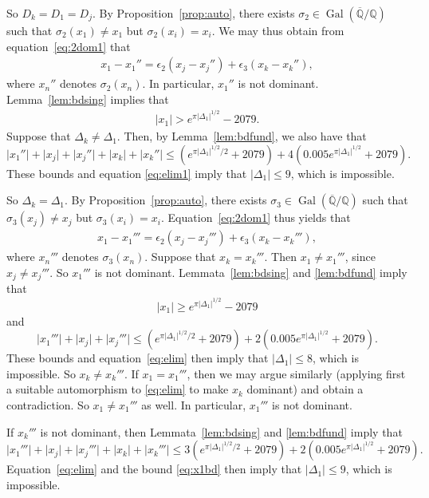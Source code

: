 \documentclass[12pt,a4paper,oneside]{amsart}
\DeclareMathOperator{\gal}{Gal}
\begin{document}
So $D_k = D_1 = D_j$. By Proposition~\ref{prop:auto}, there exists $\sigma_2 \in \gal(\overline{\mathbb Q} / \mathbb{Q})$ such that $\sigma_2(x_1) \neq x_1$ but $\sigma_2(x_i) = x_i$. We may thus obtain from equation~\eqref{eq:2dom1} that
\begin{align}\label{eq:elim1}
	x_1 - x_1'' = \epsilon_2 (x_j - x_j'') + \epsilon_3 (x_k - x_k''),
\end{align}
where $x_n''$ denotes $\sigma_2(x_n)$. In particular, $x_1''$ is not dominant. Lemma~\ref{lem:bdsing} implies that
\begin{align}\label{eq:x1bd}
    \lvert x_1 \rvert > e^{\pi \lvert \Delta_1 \rvert^{1/2}} - 2079.
\end{align} 
Suppose that $\Delta_k \neq \Delta_1$. Then, by Lemma~\ref{lem:bdfund}, we also have that
\[ \lvert x_1'' \rvert + \lvert x_j \rvert + \lvert x_j'' \rvert + \lvert x_k \rvert + \lvert x_k'' \rvert \leq (e^{\pi \lvert \Delta_1 \rvert^{1/2}/2} + 2079) + 4 (0.005e^{\pi \lvert \Delta_1 \rvert^{1/2}} + 2079).\]
These bounds and equation \eqref{eq:elim1} imply that $\lvert \Delta_1 \rvert \leq 9$, which is impossible. 

So $\Delta_k = \Delta_1$. By Proposition~\ref{prop:auto}, there exists $\sigma_3 \in \gal(\overline{\mathbb Q} / \mathbb{Q})$ such that $\sigma_3(x_j) \neq x_j$ but $\sigma_3(x_i) = x_i$. Equation~\eqref{eq:2dom1} thus yields that
\begin{align}\label{eq:elim}
	x_1 - x_1''' = \epsilon_2 (x_j - x_j''') + \epsilon_3 (x_k - x_k'''),
\end{align}
where $x_n'''$ denotes $\sigma_3(x_n)$. Suppose that $x_k = x_k'''$. Then $x_1 \neq x_1'''$, since $x_j \neq x_j'''$. So $x_1'''$ is not dominant. Lemmata~\ref{lem:bdsing} and \ref{lem:bdfund} imply that
\[ \lvert x_1 \rvert \geq e^{\pi \lvert \Delta_1 \rvert^{1/2}} - 2079\]
and
\[ \lvert x_1''' \rvert + \lvert x_j \rvert + \lvert x_j''' \rvert \leq (e^{\pi \lvert \Delta_1 \rvert^{1/2}/2} + 2079) + 2 (0.005 e^{\pi \lvert \Delta_1 \rvert^{1/2}} + 2079).\]
These bounds and equation~\eqref{eq:elim} then imply that  $\lvert \Delta_1 \rvert \leq 8$, which is impossible. So $x_k \neq x_k'''$. If $x_1 = x_1'''$, then we may argue similarly (applying first a suitable automorphism to \eqref{eq:elim} to make $x_k$ dominant) and obtain a contradiction. So $x_1 \neq x_1'''$ as well. In particular, $x_1'''$ is not dominant.


If $x_k'''$ is not dominant, then Lemmata~\ref{lem:bdsing} and \ref{lem:bdfund} imply that
\[ \lvert x_1''' \rvert + \lvert x_j \rvert + \lvert x_j''' \rvert + \lvert x_k \rvert + \lvert x_k''' \rvert \leq 3(e^{\pi \lvert \Delta_1 \rvert^{1/2}/2} + 2079) + 2 (0.005 e^{\pi \lvert \Delta_1 \rvert^{1/2}} + 2079).\]
Equation~\eqref{eq:elim} and the bound \eqref{eq:x1bd} then imply that $\lvert \Delta_1 \rvert \leq 9$, which is impossible.
\end{document}
